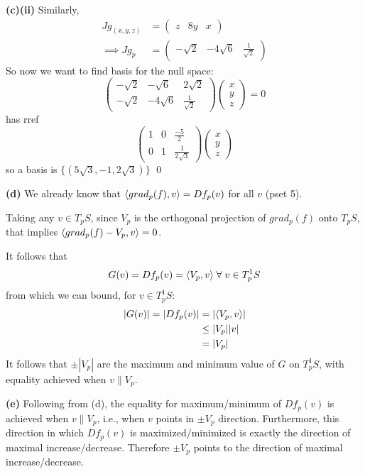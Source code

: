 \documentclass[a4paper, 12pt]{article}
\begin{document}
\begin{solution}
    \textbf{(c)(ii)} Similarly, \begin{align*}
    Jg_{(x, y, z)} &= \begin{pmatrix}
    z & 8y & x
    \end{pmatrix} \\
    \implies Jg_{p} &= \begin{pmatrix}
    -\sqrt{2} & -4 \sqrt{6} & \frac{1}{\sqrt{2}}
    \end{pmatrix}
    \end{align*}
    So now we want to find basis for the null space: 
    \[
    \begin{pmatrix}
    -\sqrt{2} & -\sqrt{6} & 2 \sqrt{2} \\
    -\sqrt{2} & -4\sqrt{6} & \frac{1}{\sqrt{2}}
    \end{pmatrix}
    \begin{pmatrix}
    x\\
    y\\
    z
    \end{pmatrix} = 0
    \]
    has rref \[
    \begin{pmatrix}
    1 & 0 & \frac{-5}{2} \\
    0 & 1 & \frac{1}{2\sqrt{3}}
    \end{pmatrix}
    \begin{pmatrix}
    x\\y\\z
    \end{pmatrix}
    \]
    so a basis is $\{(5\sqrt{3}, -1, 2\sqrt{3})\}$ \qed

    \textbf{(d)} We already know that $\langle grad_p(f), v \rangle = Df_p(v)$ for all $v$ (pset 5).

    Taking any $v \in T_p S$, since $V_p$ is the orthogonal projection of $grad_p(f)$ onto $T_p S$, that implies $\langle grad_p(f) - V_p, v \rangle = 0$.

    It follows that \[
    G(v) = Df_p(v) = \iprod{V_p}{v} \forall v \in T^1_p S
    \]
    from which we can bound, for $v \in T^1_p S$:
    \begin{align*}
    |G(v)| = |Df_p(v)| &= |\langle V_p, v \rangle| \\
    &\leq |V_p||v| \\
    &= |V_p|
    \end{align*}
    It follows that $\pm |V_p|$ are the maximum and minimum value of $G$ on $T^1_p S$, with equality achieved when $v \parallel V_p$.

    \textbf{(e)} Following from (d), the equality for maximum/minimum of $Df_p(v)$ is achieved when $v \parallel V_p$, i.e., when $v$ points in $\pm V_p$ direction. Furthermore, this direction in which $Df_p(v)$ is maximized/minimized is exactly the direction of maximal increase/decrease. Therefore $\pm V_p$ points to the direction of maximal increase/decrease.


\end{solution}
\end{document}

